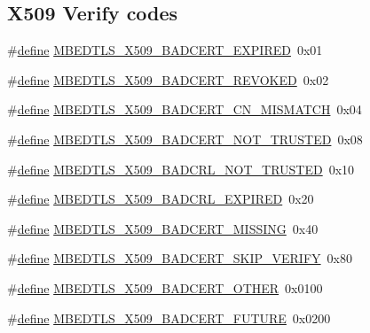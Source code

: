 \subsection*{X509 Verify codes}
\begin{DoxyCompactItemize}
\item 
\#\hyperlink{structdefine}{define} \hyperlink{group__x509__module_ga5f03158dcacc5914872e38c68231b642}{M\+B\+E\+D\+T\+L\+S\+\_\+\+X509\+\_\+\+B\+A\+D\+C\+E\+R\+T\+\_\+\+E\+X\+P\+I\+R\+ED}~0x01
\item 
\#\hyperlink{structdefine}{define} \hyperlink{group__x509__module_gaddd96a9eb80fab17bce02d2a147ea504}{M\+B\+E\+D\+T\+L\+S\+\_\+\+X509\+\_\+\+B\+A\+D\+C\+E\+R\+T\+\_\+\+R\+E\+V\+O\+K\+ED}~0x02
\item 
\#\hyperlink{structdefine}{define} \hyperlink{group__x509__module_ga6e71468985ebf243ca7cfce5c3dea881}{M\+B\+E\+D\+T\+L\+S\+\_\+\+X509\+\_\+\+B\+A\+D\+C\+E\+R\+T\+\_\+\+C\+N\+\_\+\+M\+I\+S\+M\+A\+T\+CH}~0x04
\item 
\#\hyperlink{structdefine}{define} \hyperlink{group__x509__module_ga0e5b1d4c9c1a1a3227238c82042c1d1b}{M\+B\+E\+D\+T\+L\+S\+\_\+\+X509\+\_\+\+B\+A\+D\+C\+E\+R\+T\+\_\+\+N\+O\+T\+\_\+\+T\+R\+U\+S\+T\+ED}~0x08
\item 
\#\hyperlink{structdefine}{define} \hyperlink{group__x509__module_gad1da8228ca957c2947fd329c32fc7ca4}{M\+B\+E\+D\+T\+L\+S\+\_\+\+X509\+\_\+\+B\+A\+D\+C\+R\+L\+\_\+\+N\+O\+T\+\_\+\+T\+R\+U\+S\+T\+ED}~0x10
\item 
\#\hyperlink{structdefine}{define} \hyperlink{group__x509__module_gaebccb1707af21f2d3d6610a7c6485f32}{M\+B\+E\+D\+T\+L\+S\+\_\+\+X509\+\_\+\+B\+A\+D\+C\+R\+L\+\_\+\+E\+X\+P\+I\+R\+ED}~0x20
\item 
\#\hyperlink{structdefine}{define} \hyperlink{group__x509__module_ga8bca03e3c2c89460bea17ab142b0b7ab}{M\+B\+E\+D\+T\+L\+S\+\_\+\+X509\+\_\+\+B\+A\+D\+C\+E\+R\+T\+\_\+\+M\+I\+S\+S\+I\+NG}~0x40
\item 
\#\hyperlink{structdefine}{define} \hyperlink{group__x509__module_ga1b87b2e1d26077023adf2a5c65a76776}{M\+B\+E\+D\+T\+L\+S\+\_\+\+X509\+\_\+\+B\+A\+D\+C\+E\+R\+T\+\_\+\+S\+K\+I\+P\+\_\+\+V\+E\+R\+I\+FY}~0x80
\item 
\#\hyperlink{structdefine}{define} \hyperlink{group__x509__module_ga76bdd50937a671ef62474b7e38e23e02}{M\+B\+E\+D\+T\+L\+S\+\_\+\+X509\+\_\+\+B\+A\+D\+C\+E\+R\+T\+\_\+\+O\+T\+H\+ER}~0x0100
\item 
\#\hyperlink{structdefine}{define} \hyperlink{group__x509__module_gac769acbb18e53198ae2d2e63bd339cfa}{M\+B\+E\+D\+T\+L\+S\+\_\+\+X509\+\_\+\+B\+A\+D\+C\+E\+R\+T\+\_\+\+F\+U\+T\+U\+RE}~0x0200

\end{DoxyCompactItemize}
